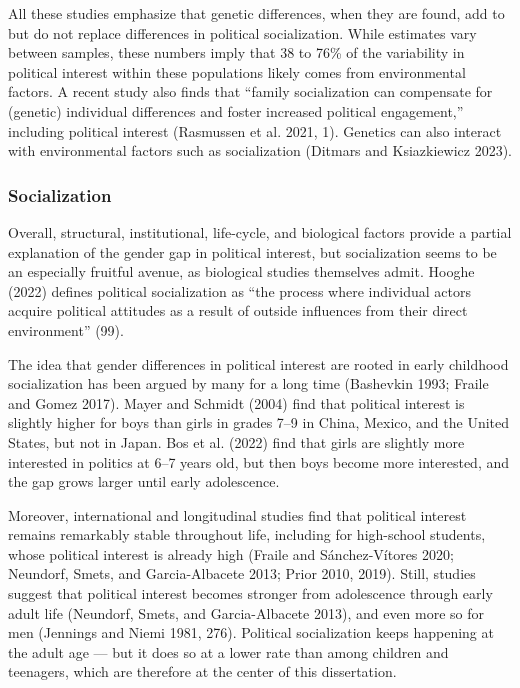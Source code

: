 \documentclass[
  letterpaper,
  DIV=11,
  numbers=noendperiod]{scrreprt}
\begin{document}
All these studies emphasize that genetic differences, when they are
found, add to but do not replace differences in political socialization.
While estimates vary between samples, these numbers imply that 38 to
76\% of the variability in political interest within these populations
likely comes from environmental factors. A recent study also finds that
``family socialization can compensate for (genetic) individual
differences and foster increased political engagement,'' including
political interest (Rasmussen et al. 2021, 1). Genetics can also
interact with environmental factors such as socialization (Ditmars and
Ksiazkiewicz 2023).

\hypertarget{socialization}{%
\subsubsection{Socialization}\label{socialization}}

Overall, structural, institutional, life-cycle, and biological factors
provide a partial explanation of the gender gap in political interest,
but socialization seems to be an especially fruitful avenue, as
biological studies themselves admit. Hooghe (2022) defines political
socialization as ``the process where individual actors acquire political
attitudes as a result of outside influences from their direct
environment'' (99).

The idea that gender differences in political interest are rooted in
early childhood socialization has been argued by many for a long time
(Bashevkin 1993; Fraile and Gomez 2017). Mayer and Schmidt (2004) find
that political interest is slightly higher for boys than girls in grades
7--9 in China, Mexico, and the United States, but not in Japan. Bos et
al. (2022) find that girls are slightly more interested in politics at
6--7 years old, but then boys become more interested, and the gap grows
larger until early adolescence.

Moreover, international and longitudinal studies find that political
interest remains remarkably stable throughout life, including for
high-school students, whose political interest is already high (Fraile
and Sánchez-Vítores 2020; Neundorf, Smets, and Garcia-Albacete 2013;
Prior 2010, 2019). Still, studies suggest that political interest
becomes stronger from adolescence through early adult life (Neundorf,
Smets, and Garcia-Albacete 2013), and even more so for men (Jennings and
Niemi 1981, 276). Political socialization keeps happening at the adult
age --- but it does so at a lower rate than among children and
teenagers, which are therefore at the center of this dissertation.
\end{document}
